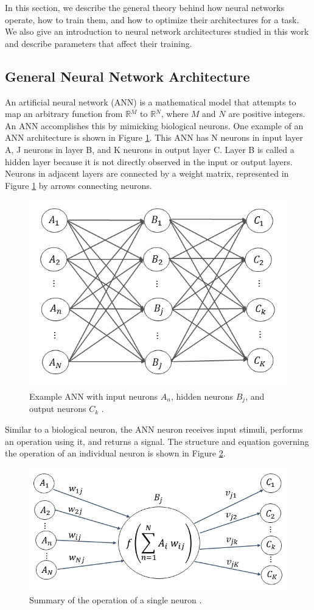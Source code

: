 In this section, we describe the general theory behind how neural networks operate, how to train them, and how to optimize their architectures for a task. We also give an introduction to neural network architectures studied in this work and describe parameters that affect their training.


\subsection{General Neural Network Architecture}

An artificial neural network (ANN) is a mathematical model that attempts to map an arbitrary function from $\mathbb{R}{^M}$ to $\mathbb{R}{^N}$, where $M$ and $N$ are positive integers. An ANN accomplishes this by mimicking biological neurons. One example of an ANN architecture is shown in Figure \ref{fig:Network}. This ANN has N neurons in input layer A, J neurons in layer B, and K neurons in output layer C. Layer B is called a hidden layer because it is not directly observed in the input or output layers. Neurons in adjacent layers are connected by a weight matrix, represented in Figure \ref{fig:Network} by arrows connecting neurons.


\begin{figure}[H]
\centering
\includegraphics[width=0.75\linewidth]{images/Network}
\caption{Example ANN with input neurons $A_n$, hidden neurons $B_j$, and output neurons $C_k$ \cite{kamuda2017}.}
\label{fig:Network}
\end{figure}


Similar to a biological neuron, the ANN neuron receives input stimuli, performs an operation using it, and returns a signal. The structure and equation governing the operation of an individual neuron is shown in Figure \ref{fig:Node}. 

\begin{figure}[H]
	\centering
	\includegraphics[width=0.75\linewidth]{images/Node_ABC_2}
	\caption{Summary of the operation of a single neuron \cite{kamuda2017}.}
	\label{fig:Node}
\end{figure}

